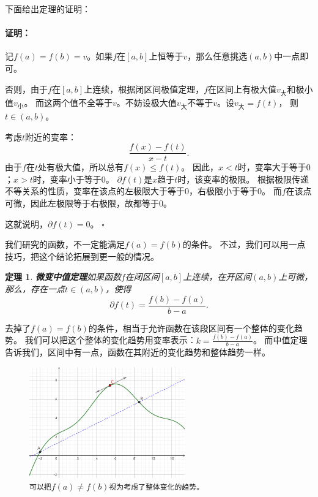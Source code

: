 \documentclass[12pt,UTF8]{ctexbook}
\renewenvironment{proof}{\paragraph{\textbf{证明：}}}{\hfill$\square$}
\newtheorem{tm}{定理}[section]
\begin{document}
下面给出定理的证明：
\begin{proof}
    记$f(a) = f(b) = v$。如果$f$在$[a,b]$上恒等于$v$，那么任意挑选$(a, b)$中一点即可。

    否则，由于$f$在$[a,b]$上连续，根据闭区间极值定理，$f$在区间上有极大值$v_{\text{大}}$和极小值$v_{\text{小}}$。
    而这两个值不全等于$v$。不妨设极大值$v_{\text{大}}$不等于$v$。设$v_{\text{大}} = f(t)$，
    则$t\in(a, b)$。

    考虑$t$附近的变率：
    $$ \frac{f(x) - f(t)}{x - t}. $$
    由于$f$在$t$处有极大值，所以总有$f(x) \leqslant f(t)$。
    因此，$x<t$时，变率大于等于$0$；$x>t$时，变率小于等于$0$。
    $\partial f(t)$是$x$趋于$t$时，该变率的极限。
    根据极限传递不等关系的性质，变率在该点的左极限大于等于$0$，右极限小于等于$0$。
    而$f$在该点可微，因此左极限等于右极限，故都等于$0$。
    
    这就说明，$ \partial f(t) = 0$。
\end{proof}

我们研究的函数，不一定能满足$f(a) = f(b)$的条件。
不过，我们可以用一点技巧，把这个结论拓展到更一般的情况。

\begin{tm}{\textbf{微变中值定理}}\label{tm:2-4-10}
    如果函数$f$在闭区间$[a, b]$上连续，在开区间$(a, b)$上可微，
    那么，存在一点$t\in(a, b)$，使得
    $$ \partial f(t) = \frac{f(b) - f(a)}{b - a}.$$
\end{tm}

去掉了$f(a) = f(b)$的条件，相当于允许函数在该段区间有一个整体的变化趋势。
我们可以把这个整体的变化趋势用变率表示：$k = \frac{f(b) - f(a)}{b - a}$。
而中值定理告诉我们，区间中有一点，函数在其附近的变化趋势和整体趋势一样。

\begin{figure}[h]
    \centering
    \includegraphics[width=0.6\textwidth]{tu/微变中值定理1.png}    
    \caption*{\texttt{可以把}$f(a) \neq f(b)$\texttt{视为考虑了整体变化的趋势。}}
\end{figure}
\end{document}
